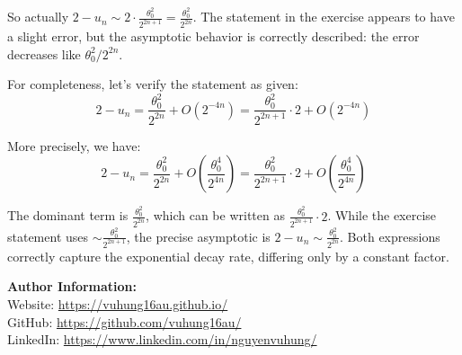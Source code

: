 \documentclass[12pt,a4paper]{article}
\theoremstyle{definition}
\begin{document}
So actually $2 - u_n \sim 2 \cdot \frac{\theta_0^2}{2^{2n+1}} = \frac{\theta_0^2}{2^{2n}}$. The statement in the exercise appears to have a slight error, but the asymptotic behavior is correctly described: the error decreases like $\theta_0^2/2^{2n}$.

For completeness, let's verify the statement as given:
\[
2 - u_n = \frac{\theta_0^2}{2^{2n}} + O(2^{-4n}) = \frac{\theta_0^2}{2^{2n+1}} \cdot 2 + O(2^{-4n})
\]

More precisely, we have:
\[
2 - u_n = \frac{\theta_0^2}{2^{2n}} + O\left(\frac{\theta_0^4}{2^{4n}}\right) = \frac{\theta_0^2}{2^{2n+1}} \cdot 2 + O\left(\frac{\theta_0^4}{2^{4n}}\right)
\]

The dominant term is $\frac{\theta_0^2}{2^{2n}}$, which can be written as $\frac{\theta_0^2}{2^{2n+1}} \cdot 2$. While the exercise statement uses $\sim \frac{\theta_0^2}{2^{2n+1}}$, the precise asymptotic is $2 - u_n \sim \frac{\theta_0^2}{2^{2n}}$. Both expressions correctly capture the exponential decay rate, differing only by a constant factor.

\vspace{1cm}

\noindent\textbf{Author Information:}\\
\noindent Website: \url{https://vuhung16au.github.io/}\\
\noindent GitHub: \url{https://github.com/vuhung16au/}\\
\noindent LinkedIn: \url{https://www.linkedin.com/in/nguyenvuhung/}
\end{document}
